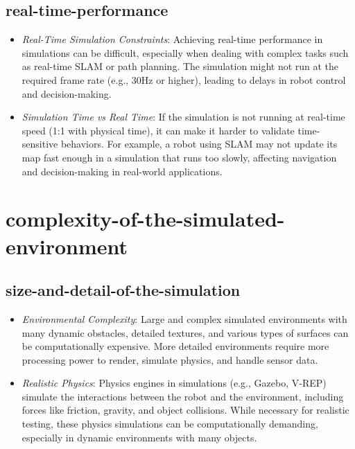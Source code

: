 \documentclass[../../main]{subfiles}
\begin{document}
    \subsection{real-time-performance}
    
    \begin{itemize}
    \item
      \emph{Real-Time Simulation Constraints}: Achieving real-time
      performance in simulations can be difficult, especially when dealing
      with complex tasks such as real-time SLAM or path planning. The
      simulation might not run at the required frame rate (e.g., 30Hz or
      higher), leading to delays in robot control and decision-making.
    \item
      \emph{Simulation Time vs Real Time}: If the simulation is not
      running at real-time speed (1:1 with physical time), it can make it
      harder to validate time-sensitive behaviors. For example, a robot
      using SLAM may not update its map fast enough in a simulation that
      runs too slowly, affecting navigation and decision-making in
      real-world applications.
    \end{itemize}
    
    \section{complexity-of-the-simulated-environment}

    \subsection{size-and-detail-of-the-simulation}    
    \begin{itemize}
    \item
      \emph{Environmental Complexity}: Large and complex simulated
      environments with many dynamic obstacles, detailed textures, and
      various types of surfaces can be computationally expensive. More
      detailed environments require more processing power to render,
      simulate physics, and handle sensor data.
    \item
      \emph{Realistic Physics}: Physics engines in simulations (e.g.,
      Gazebo, V-REP) simulate the interactions between the robot and the
      environment, including forces like friction, gravity, and object
      collisions. While necessary for realistic testing, these physics
      simulations can be computationally demanding, especially in dynamic
      environments with many objects.
    \end{itemize}
    
\end{document}
